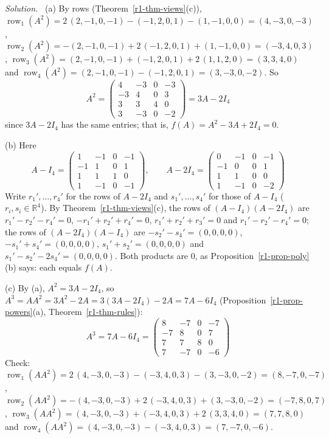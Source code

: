 \documentclass[12pt]{article}
\newcommand{\R}{\mathbb R}
\DeclareMathOperator{\row}{row}
\theoremstyle{definition}
\newenvironment{solution}{\par\noindent\textit{Solution.}\ }{\par\smallskip}
\begin{document}
\begin{solution}
(a) By rows (Theorem~\ref{r1-thm-views}(c)), \(\row_1(A^2)=2\,(2,-1,0,-1)-(-1,2,0,1)-(1,-1,0,0)=(4,-3,0,-3)\),
\(\row_2(A^2)=-(2,-1,0,-1)+2\,(-1,2,0,1)+(1,-1,0,0)=(-3,4,0,3)\),
\(\row_3(A^2)=(2,-1,0,-1)+(-1,2,0,1)+2\,(1,1,2,0)=(3,3,4,0)\) and
\(\row_4(A^2)=(2,-1,0,-1)-(-1,2,0,1)=(3,-3,0,-2)\). So
\[
A^2=\begin{pmatrix}4&-3&0&-3\\-3&4&0&3\\3&3&4&0\\3&-3&0&-2\end{pmatrix}=3A-2I_4
\]
since \(3A-2I_4\) has the same entries; that is, \(f(A)=A^2-3A+2I_4=0\).

(b) Here
\[
A-I_4=\begin{pmatrix}1&-1&0&-1\\-1&1&0&1\\1&1&1&0\\1&-1&0&-1\end{pmatrix},\qquad
A-2I_4=\begin{pmatrix}0&-1&0&-1\\-1&0&0&1\\1&1&0&0\\1&-1&0&-2\end{pmatrix}
\]
Write \(r_1',\dots,r_4'\) for the rows of \(A-2I_4\) and \(s_1',\dots,s_4'\) for those of \(A-I_4\)
(\(r_i,s_i\in\R^4\)). By Theorem~\ref{r1-thm-views}(c), the rows of \((A-I_4)(A-2I_4)\) are \(r_1'-r_2'-r_4'=0\),
\(-r_1'+r_2'+r_4'=0\), \(r_1'+r_2'+r_3'=0\) and \(r_1'-r_2'-r_4'=0\); the rows of \((A-2I_4)(A-I_4)\) are
\(-s_2'-s_4'=(0,0,0,0)\), \(-s_1'+s_4'=(0,0,0,0)\), \(s_1'+s_2'=(0,0,0,0)\) and \(s_1'-s_2'-2s_4'=(0,0,0,0)\). Both
products are \(0\), as Proposition~\ref{r1-prop-poly}(b) says: each equals \(f(A)\).

(c) By (a), \(A^2=3A-2I_4\), so \(A^3=AA^2=3A^2-2A=3(3A-2I_4)-2A=7A-6I_4\) (Proposition~\ref{r1-prop-powers}(a),
Theorem~\ref{r1-thm-rules}):
\[
A^3=7A-6I_4=\begin{pmatrix}8&-7&0&-7\\-7&8&0&7\\7&7&8&0\\7&-7&0&-6\end{pmatrix}
\]
Check: \(\row_1(AA^2)=2\,(4,-3,0,-3)-(-3,4,0,3)-(3,-3,0,-2)=(8,-7,0,-7)\),
\(\row_2(AA^2)=-(4,-3,0,-3)+2\,(-3,4,0,3)+(3,-3,0,-2)=(-7,8,0,7)\),
\(\row_3(AA^2)=(4,-3,0,-3)+(-3,4,0,3)+2\,(3,3,4,0)=(7,7,8,0)\) and
\(\row_4(AA^2)=(4,-3,0,-3)-(-3,4,0,3)=(7,-7,0,-6)\).
\end{solution}
\end{document}
